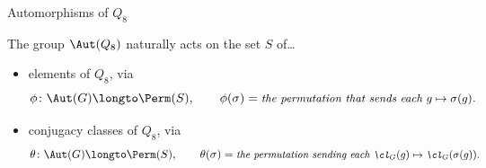 \documentclass[8pt, handout]{beamer}
\begin{document}
\begin{frame}{Automorphisms of $Q_8$} %
  
  The group $\Aut(Q_8)$ naturally acts on the set $S$ of\dots \medskip
  \begin{itemize}
  \item elements of $Q_8$, via
    \[
    \phi\colon\Aut(G)\longto\Perm(S),\qquad
    \phi(\sigma)=\text{\small
      \emph{the permutation that sends each $g\mapsto \sigma(g)$.}}
    \]
  \item conjugacy classes of $Q_8$, via 
    \[
    \theta\colon\Aut(G)\longto\Perm(S),\qquad\theta(\sigma) 
    =\text{\small
      \emph{the permutation sending each $\cl_G(g)\mapsto \cl_G(\sigma(g))$}.}
    \]
  \end{itemize}
  

\end{frame}
\end{document}
